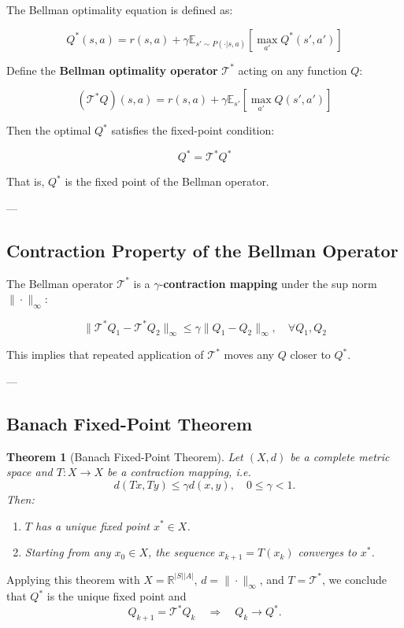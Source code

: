 \documentclass[12pt]{article}
\theoremstyle{definition} %
\theoremstyle{plain} %
\newtheorem{theorem}[definition]{Theorem}
\theoremstyle{remark} %
\begin{document}
\begin{CJK}{UTF8}{gbsn}
The Bellman optimality equation is defined as:

\[
Q^*(s,a) = r(s,a) + \gamma \mathbb{E}_{s' \sim P(\cdot|s,a)}\left[\max_{a'} Q^*(s', a')\right]
\]

Define the \textbf{Bellman optimality operator} \( \mathcal{T}^* \) acting on any function \( Q \):

\[
(\mathcal{T}^* Q)(s,a) = r(s,a) + \gamma \mathbb{E}_{s'}\left[\max_{a'} Q(s',a')\right]
\]

Then the optimal \( Q^* \) satisfies the fixed-point condition:

\[
Q^* = \mathcal{T}^* Q^*
\]

That is, \( Q^* \) is the fixed point of the Bellman operator.

---

\subsection{Contraction Property of the Bellman Operator}

The Bellman operator \( \mathcal{T}^* \) is a \(\gamma\)-\textbf{contraction mapping} under the sup norm \( \|\cdot\|_\infty \):

\[
\|\mathcal{T}^* Q_1 - \mathcal{T}^* Q_2\|_\infty \le \gamma \|Q_1 - Q_2\|_\infty, \quad \forall Q_1, Q_2
\]

This implies that repeated application of \( \mathcal{T}^* \) moves any \( Q \) closer to \( Q^* \).

---

\subsection{Banach Fixed-Point Theorem}

\begin{theorem}[Banach Fixed-Point Theorem]
Let \( (X, d) \) be a complete metric space and \( T : X \to X \) be a contraction mapping, i.e.
\[
d(Tx, Ty) \le \gamma d(x,y), \quad 0 \le \gamma < 1.
\]
Then:
\begin{enumerate}
    \item \( T \) has a unique fixed point \( x^* \in X \).
    \item Starting from any \( x_0 \in X \), the sequence \( x_{k+1} = T(x_k) \) converges to \( x^* \).
\end{enumerate}
\end{theorem}

Applying this theorem with \( X = \mathbb{R}^{|S||A|} \), \( d = \|\cdot\|_\infty \), and \( T = \mathcal{T}^* \),
we conclude that \( Q^* \) is the unique fixed point and
\[
Q_{k+1} = \mathcal{T}^* Q_k \quad \Longrightarrow \quad Q_k \to Q^*.
\]


\end{CJK}
\end{document}

